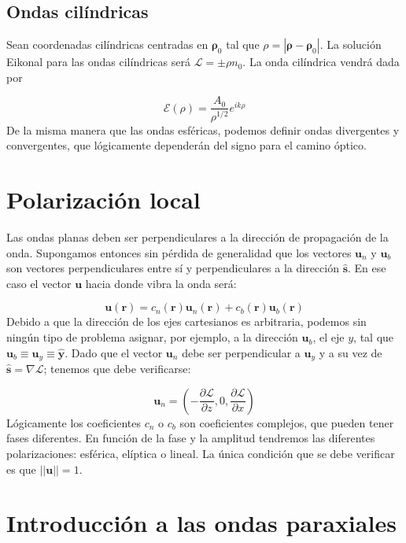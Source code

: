 \documentclass[12pt,a4paper]{book}
\numberwithin{equation}{section}
\numberwithin{figure}{section}
\newcommand{\parentesis}[1]{\left( #1  \right)}
\newcommand{\parciales}[2]{\frac{\partial #1}{\partial #2}}
\newcommand{\1}{_{(1)}}
\newcommand{\2}{_{(2)}}
\newcommand{\yn}{\mathbf{y}}
\newcommand{\un}{\mathbf{u}}
\newcommand{\rn}{\mathbf{r}}
\newcommand{\sn}{\mathbf{s}}
\newcommand{\rhon}{\mathbf{\rho}}
\newcommand{\hns}{\hat{\sn}}
\newcommand{\hny}{\hat{\yn}}
\theoremstyle{definition}
\begin{document}
\subsection{Ondas cilíndricas}

Sean coordenadas cilíndricas centradas en $\rhon_0$ tal que $\rho = | \rhon - \rhon_0|$. La solución Eikonal para las ondas cilíndricas será $\mathcal{L} = \pm \rho n_0$. La onda cilíndrica vendrá dada por

\begin{equation}
\mathcal{E} (\rho) = \dfrac{A_0}{\rho^{1/2}} e^{i k \rho}
\end{equation}
De la misma manera que las ondas esféricas, podemos definir ondas divergentes y convergentes, que lógicamente dependerán del signo para el camino óptico.


\section{Polarización local}

Las ondas planas deben ser perpendiculares a la dirección de propagación de la onda. Supongamos entonces sin pérdida de generalidad que los vectores $\un_n$ y $\un_b$ son vectores perpendiculares entre sí y perpendiculares a la dirección $\hns$. En ese caso el vector $\un$ hacia donde vibra la onda será:

\begin{equation}
\un (\rn) = c_n (\rn) \un_n (\rn) + c_b (\rn) \un_b (\rn)
\end{equation}
Debido a que la dirección de los ejes cartesianos es arbitraria, podemos sin ningún tipo de problema asignar, por ejemplo, a la dirección $\un_b$, el eje $y$, tal que $\un_b \equiv \un_y \equiv  \hny$. Dado que el vector $\un_n$ debe ser perpendicular a $\un_y$ y a su vez de $\hns = \nabla \mathcal{L}$; tenemos que debe verificarse:

\begin{equation}
\un_n = \parentesis{ - \parciales{\mathcal{L}}{z} , 0 , \parciales{\mathcal{L}}{x}} 
\end{equation}
Lógicamente los coeficientes $c_n$ o $c_b$ son coeficientes complejos, que pueden tener fases diferentes. En función de la fase y la amplitud tendremos las diferentes polarizaciones: esférica, elíptica o lineal. La única condición que se debe verificar es que $||\un||=1$. 

\section{Introducción a las ondas paraxiales}
\end{document}
